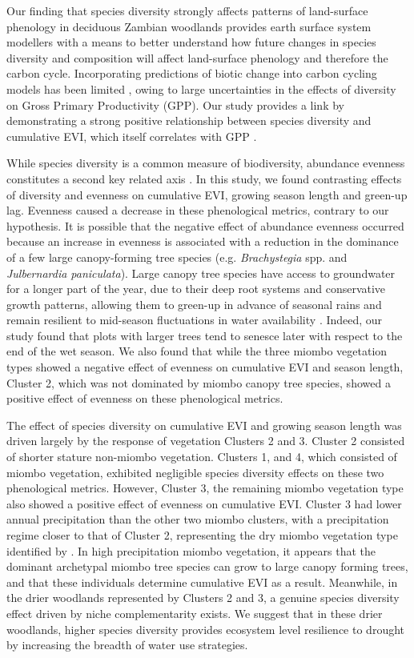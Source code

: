 \begin{refsection}
Our finding that species diversity strongly affects patterns of land-surface phenology in deciduous Zambian woodlands provides earth surface system modellers with a means to better understand how future changes in species diversity and composition will affect land-surface phenology and therefore the carbon cycle. Incorporating predictions of biotic change into carbon cycling models has been limited \citep{Ahlstrom2015, Bodegom2011}, owing to large uncertainties in the effects of diversity on Gross Primary Productivity (GPP). Our study provides a link by demonstrating a strong positive relationship between species diversity and cumulative EVI, which itself correlates with GPP \citep{Sjostrom2011}.

While species diversity is a common measure of biodiversity, abundance evenness constitutes a second key related axis \citep{Wilsey2005, Hillebrand2008, Jost2010}. In this study, we found contrasting effects of diversity and evenness on cumulative EVI, growing season length and green-up lag. Evenness caused a decrease in these phenological metrics, contrary to our hypothesis. It is possible that the negative effect of abundance evenness occurred because an increase in evenness is associated with a reduction in the dominance of a few large canopy-forming tree species (e.g. \textit{Brachystegia} spp. and \textit{Julbernardia paniculata}). Large canopy tree species have access to groundwater for a longer part of the year, due to their deep root systems and conservative growth patterns, allowing them to green-up in advance of seasonal rains and remain resilient to mid-season fluctuations in water availability \citep{Zhou2020}. Indeed, our study found that plots with larger trees tend to senesce later with respect to the end of the wet season. We also found that while the three miombo vegetation types showed a negative effect of evenness on cumulative EVI and season length, Cluster 2, which was not dominated by miombo canopy tree species, showed a positive effect of evenness on these phenological metrics. 

The effect of species diversity on cumulative EVI and growing season length was driven largely by the response of vegetation Clusters 2 and 3. Cluster 2 consisted of shorter stature non-miombo vegetation. Clusters 1, and 4, which consisted of miombo vegetation, exhibited negligible species diversity effects on these two phenological metrics. However, Cluster 3, the remaining miombo vegetation type also showed a positive effect of evenness on cumulative EVI. Cluster 3 had lower annual precipitation than the other two miombo clusters, with a precipitation regime closer to that of Cluster 2, representing the dry miombo vegetation type identified by \citet{White1983}. In high precipitation miombo vegetation, it appears that the dominant archetypal miombo tree species can grow to large canopy forming trees, and that these individuals determine cumulative EVI as a result. Meanwhile, in the drier woodlands represented by Clusters 2 and 3, a genuine species diversity effect driven by niche complementarity exists. We suggest that in these drier woodlands, higher species diversity provides ecosystem level resilience to drought by increasing the breadth of water use strategies. 


\end{refsection}
